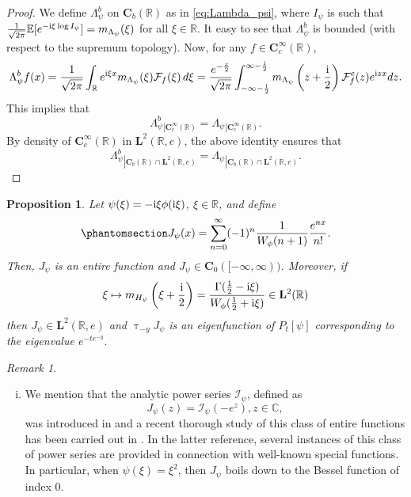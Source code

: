 \documentclass[12pt]{amsart}
\newcommand{\hlabel}{\phantomsection\label}
\numberwithin{equation}{section}
\newcommand{\bb}{\mathbb}
\newcommand{\cc}{\mathcal}
\newcommand{\hpt}[2]{#2}
\newcommand{\bmrm}[2][2]{\mathbf{#2}^{#1}}
\newcommand{\Jpo}{J_{\psi}}
\newcommand{\fouho}{\cc{F}^{e}}
\newcommand{\C}{\mathbf{C}}
\renewcommand{\tau}{\uptau}
\newtheorem{prop}[thm]{Proposition}
\theoremstyle{definition}
\theoremstyle{assump}
\theoremstyle{remark}
\newtheorem{rem}[thm]{Remark}
\begin{document}
{\begin{proof}
We define $\Lambda^b_\psi$ on $\C_b(\bb{R})$ as in \eqref{eq:Lambda_psi}, where ${I}_\psi$ is such that $\frac{1}{\sqrt{2\pi}}\bb{E}[e^{-{\rm{i}}\xi \log I_\psi}]=m_{\Lambda_\psi}(\xi)$ for all $\xi\in\bb{R}$. It easy to see that $\Lambda^b_\psi$ is bounded (with respect to the supremum topology). Now, for any $f\in \C^\infty_c(\bb{R})$,
\begin{align*}
\Lambda^b_\psi f(x)=\frac{1}{\sqrt{2\pi}}\int_{\bb{R}} e^{{\rm{i}}\xi  x}m_{\Lambda_\psi}(\xi)\mathcal{F}_{f}(\xi)\,d\xi=\hpt{R36}{\frac{e^{-\frac{x}{2}}}{\sqrt{2\pi}}\int_{-\infty-\frac{{\rm{i}}}{2}}^{\infty-\frac{{\rm{i}}}{2}}m_{\Lambda_\psi}\left(z+\frac{{\rm{i}}}{2}   \right)\fouho_{f}(z) e^{{\rm{i}}zx} dz}.
\end{align*}
 This implies that
$$\Lambda^b_\psi {}_{\left.\right|{\C^\infty_c(\bb{R})}}=\Lambda_\psi {}_{\left.\right|{\C^\infty_c(\bb{R})}}.$$
By density of $\C^\infty_c(\bb{R})$ in $\bmrm{L}(\bb{R},e)$, the above identity ensures that $$\Lambda^b_\psi {}_{\left.\right|{\C_b(\bb{R})\cap\bmrm{L}(\bb{R},e)}}=
\Lambda_\psi {}_{\left.\right|{\C_b(\bb{R})\cap\bmrm{L}(\bb{R},e)}}.$$
\end{proof}
\begin{prop}\hlabel{prop:one_sided_jump}
Let $\psi(\xi)=-{\rm{i}}\xi \phi({\rm{i}}\xi   )$, $\xi\in\bb{R}$, and define
\begin{align}\hlabel{eq:eigenfunction_1}
\Jpo(x)=\sum_{n=0}^\infty (-1)^n\frac{1}{W_{\phi}(n+1)}\frac{e^{nx}}{n!}.
\end{align}
Then, $\Jpo$  is an entire function and $\Jpo\in \C_0([-\infty,\infty))$. Moreover, if\[\xi\mapsto m_{H_\psi}\left(\xi+\frac{{\rm{i}}}{2}   \right)=\frac{\Gamma(\frac{1}{2}-{\rm{i}}\xi   )}{W_{\phi}(\frac{1}{2}+\mathrm{i}\xi)}\in\bmrm{L}(\bb{R}) \] then $\Jpo\in\bmrm{L}(\bb{R},e)$ and $\tau_{-y}\Jpo$ is an eigenfunction of $P_t[\psi]$ corresponding to the eigenvalue $e^{-te^{-y}}.$
\end{prop}
\begin{rem}
\begin{enumerate}[(i)]
\item We mention that the analytic power series $\cc{I}_\psi$, defined as \[J_\psi(z)=\cc{I}_\psi(-e^z), z\in \bb{C},\] was introduced in \cite{PatieAIHP} and a recent thorough study of this class of entire functions has been carried out in \cite{Bart-Patie}. In the latter reference, several instances of this class of power series are provided in connection with well-known special functions. In particular, when $\psi(\xi)=\xi^2$, then $\Jpo$ boils down to the Bessel function of index $0$.

\end{enumerate}
\end{rem}}
\end{document}
